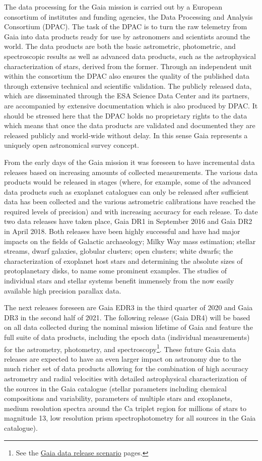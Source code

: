 The data processing for the Gaia mission is carried out by a European consortium of institutes and funding agencies, the Data Processing and Analysis Consortium (DPAC). The task of the DPAC is to turn the raw telemetry from Gaia into data products ready for use by astronomers and scientists around the world. The data products are both the basic astrometric, photometric, and spectroscopic results as well as advanced data products, such as the astrophysical characterization of stars, derived from the former. Through an independent unit within the consortium the DPAC also ensures the quality of the published data through extensive technical and scientific validation. The publicly released data, which are disseminated through the ESA Science Data Center and its partners, are accompanied by extensive documentation which is also produced by DPAC. It should be stressed here that the DPAC holds no proprietary rights to the data which means that once the data products are validated and documented they are released publicly and world-wide without delay. In this sense Gaia represents a uniquely open astronomical survey concept.

From the early days of the Gaia mission it was foreseen to have incremental data releases based on increasing amounts of collected measurements. The various data products would be released in stages (where, for example, some of the advanced data products such as exoplanet catalogues can only be released after sufficient data has been collected and the various astrometric calibrations have reached the required levels of precision) and with increasing accuracy for each release. To date two data releases have taken place, Gaia DR1 in September 2016 and Gaia DR2 in April 2018. Both releases have been highly successful and have had major impacts on the fields of Galactic archaeology; Milky Way mass estimation; stellar streams, dwarf galaxies, globular clusters; open clusters; white dwarfs; the characterization of exoplanet host stars and determining the absolute sizes of protoplanetary disks, to name some prominent examples. The studies of individual stars and stellar systems benefit immensely from the now easily available high precision parallax data.

The next releases foreseen are Gaia EDR3 in the third quarter of 2020 and Gaia DR3 in the second half of 2021. The following release (Gaia DR4) will be based on all data collected during the nominal mission lifetime of Gaia and feature the full suite of data products, including the epoch data (individual measurements) for the astrometry, photometry, and spectroscopy\footnote{See the \href{https://www.cosmos.esa.int/web/gaia/release}{Gaia data release scenario} pages.}. These future Gaia data releases are expected to have an even larger impact on astronomy due to the much richer set of data products allowing for the combination of high accuracy astrometry and radial velocities with detailed astrophysical characterization of the sources in the Gaia catalogue (stellar parameters including chemical compositions and variability, parameters of multiple stars and exoplanets, medium resolution spectra around the Ca triplet region for millions of stars to magnitude 13, low resolution prism spectrophotometry for all sources in the Gaia catalogue). 

